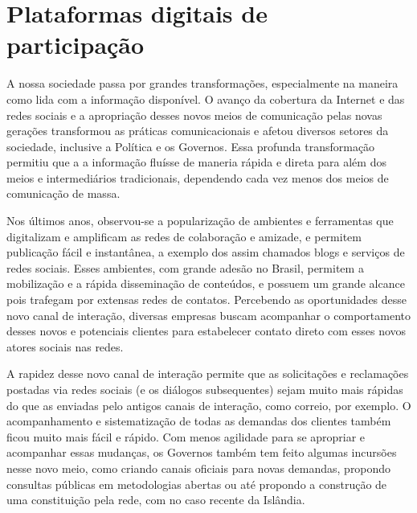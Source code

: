 \documentclass{article}
\begin{document}
\section{Plataformas digitais de participação}


A nossa sociedade passa por grandes transformações, especialmente na maneira
como lida com a informação disponível. O avanço da cobertura da Internet e das
redes sociais e a apropriação desses novos meios de comunicação pelas novas
gerações transformou as práticas comunicacionais e afetou diversos setores da
sociedade, inclusive a Política e os Governos. Essa profunda transformação
permitiu que a a informação fluísse de maneria rápida e direta para além dos
meios e intermediários tradicionais, dependendo cada vez menos dos meios de
comunicação de massa. 

Nos últimos anos, observou-se a popularização de ambientes e ferramentas que
digitalizam e amplificam as redes de colaboração e amizade, e permitem
publicação fácil e instantânea, a exemplo dos assim chamados blogs e serviços
de redes sociais. Esses ambientes, com grande adesão no Brasil, permitem a
mobilização e a rápida disseminação de conteúdos,  e possuem um grande alcance
pois trafegam por extensas redes de contatos. Percebendo as oportunidades desse
novo canal de interação, diversas empresas buscam acompanhar o comportamento
desses novos e potenciais clientes para estabelecer contato direto com esses
novos atores sociais nas redes.

A rapidez desse novo canal de interação permite que as solicitações e
reclamações postadas via redes sociais (e os diálogos subsequentes) sejam muito
mais rápidas do que as enviadas pelo antigos canais de interação, como correio,
por exemplo. O acompanhamento e sistematização de todas as demandas dos
clientes também ficou muito mais fácil e rápido. Com menos agilidade para se
apropriar e acompanhar essas mudanças, os Governos também tem feito algumas
incursões nesse novo meio, como criando canais oficiais para novas demandas,
propondo consultas públicas em metodologias abertas ou até propondo a
construção de uma constituição pela rede, com no caso recente da Islândia.

\end{document}
